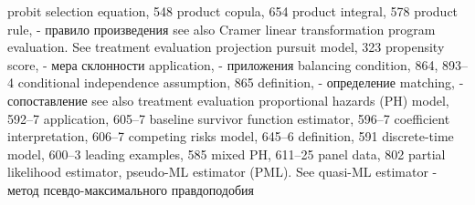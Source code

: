 probit selection equation, 548 
product copula, 654
product integral, 578
product rule, - правило произведения
see also Cramer linear transformation program evaluation. See treatment evaluation projection pursuit model, 323
propensity score, - мера склонности
application, - приложения
balancing condition, 864, 893–4 conditional independence assumption, 865 
definition, - определение
matching, - сопоставление
see also treatment evaluation
proportional hazards (PH) model, 592–7 application, 605–7
baseline survivor function estimator, 596–7 coefficient interpretation, 606–7
competing risks model, 645–6 definition, 591
discrete-time model, 600–3 leading examples, 585
mixed PH, 611–25
panel data, 802
partial likelihood estimator, 
pseudo-ML estimator (PML). See quasi-ML estimator - метод псевдо-максимального правдоподобия

